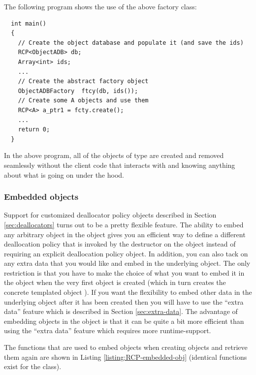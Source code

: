 \documentclass[pdf,ps2pdf,11pt]{SANDreport}
\begin{document}
The following program shows the use of the above factory class:

{\small\begin{verbatim}
  int main()
  {
    // Create the object database and populate it (and save the ids)
    RCP<ObjectADB> db;
    Array<int> ids;
    ...
    // Create the abstract factory object
    ObjectADBFactory  ftcy(db, ids());
    // Create some A objects and use them
    RCP<A> a_ptr1 = fcty.create();
    ...
    return 0;
  }
\end{verbatim}}

In the above program, all of the objects of type {} are
created and removed seamlessly without the client code that interacts
with {} and {} knowing anything
about what is going on under the hood.


%
{}\subsubsection{Embedded objects}
\label{sec:embedded-objecs}
%

Support for customized deallocator policy objects described in Section
{}\ref{sec:deallocators} turns out to be a pretty flexible feature.
The ability to embed any arbitrary object in the {}
object gives you an efficient way to define a different deallocation
policy that is invoked by the destructor on the object instead of
requiring an explicit deallocation policy object.  In addition, you
can also tack on any extra data that you would like and embed in the
underlying {} object.  The only restriction is
that you have to make the choice of what you want to embed it in the
{} object when the very first {} object is
created (which in turn creates the concrete templated
{} object ).  If you want the flexibility to embed
other data in the underlying {} object after it has
been created then you will have to use the ``extra data'' feature
which is described in Section {}\ref{sec:extra-data}.  The advantage
of embedding objects in the {} object is that it
can be quite a bit more efficient than using the ``extra data''
feature which requires more runtime-support.

The functions that are used to embed objects when creating
{} objects and retrieve them again are shown in Listing
{}\ref{listing:RCP-embedded-obj} (identical functions exist for the
{} class).
\end{document}
